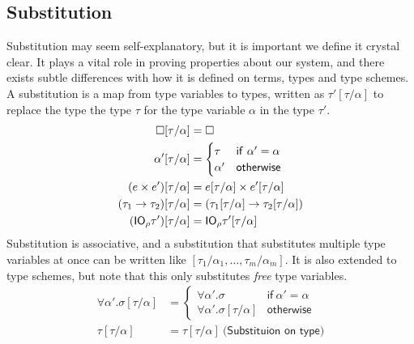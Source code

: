 \subsection{Substitution}
Substitution may seem self-explanatory, but it is important we define
it crystal clear. It plays a vital role in proving properties about
our system, and there exists subtle differences with how it is defined
on terms, types and type schemes. A substitution is a map from type
variables to types, written as $\tau'[\tau/\alpha]$ to replace the type the type
$\tau$ for the type variable $\alpha$ in the type $\tau'$.
\begin{align*}
  \square [\tau/\alpha] &= \square \\
  \alpha' [\tau/\alpha] &=
             \begin{cases}
               \tau & \mathsf{if} \ \alpha' = \alpha \\
               \alpha' & \mathsf{otherwise}
             \end{cases} \\
  (e \times e') [\tau/\alpha] &= e[\tau/\alpha] \times e'[\tau/\alpha] \\
  (\tau_1 \rightarrow \tau_2)[\tau/\alpha] &= (\tau_1[\tau/\alpha] \rightarrow \tau_2[\tau/\alpha]) \\
  (\mathsf{IO}_\rho \tau')[\tau/\alpha] &= \mathsf{IO}_\rho \tau'[\tau/\alpha]
\end{align*}
Substitution is associative, and a substitution that substitutes
multiple type variables at once can be written like
$[\tau_1/\alpha_1,\ldots,\tau_m/\alpha_m]$. It is also extended to type schemes, but note
that this only substitutes \emph{free} type variables.
\begin{align*}
  \forall \alpha' . \sigma[\tau/\alpha] &=
            \begin{cases}
              \forall \alpha' . \sigma & \mathsf{if} \ \alpha' = \alpha \\
              \forall \alpha' . \sigma[\tau/\alpha] & \mathsf{otherwise}
            \end{cases} \\
  \tau[\tau/\alpha] &= \tau[\tau/\alpha] \ \textsf{(Substituion on type)}
\end{align*}

\newcommand{\dom}{\operatorname{dom}}

